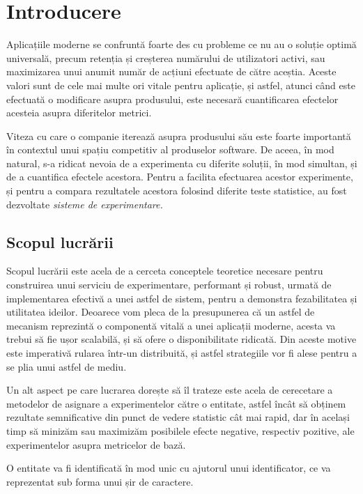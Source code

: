 \chapter{Introducere}

Aplicațiile moderne se confruntă foarte des cu probleme ce nu au o soluție optimă universală, precum retenția și creșterea numărului de utilizatori activi, sau maximizarea unui anumit număr de acțiuni efectuate de către aceștia. Aceste valori sunt de cele mai multe ori vitale pentru aplicație, și astfel, atunci când este efectuată o modificare asupra produsului, este necesară cuantificarea efectelor acesteia asupra diferitelor metrici. 

Viteza cu care o companie iterează asupra produsului său este foarte importantă în contextul unui spațiu competitiv al produselor software. De aceea, în mod natural, s-a ridicat nevoia de a experimenta cu diferite soluții, în mod simultan, și de a cuantifica efectele acestora. Pentru a facilita efectuarea acestor experimente, și pentru a compara rezultatele acestora folosind diferite teste statistice, au fost dezvoltate \textit{sisteme de experimentare. }

\section{Scopul lucrării}

Scopul lucrării este acela de a cerceta conceptele teoretice necesare pentru construirea unui serviciu de experimentare, performant și robust, urmată de implementarea efectivă a unei astfel de sistem, pentru a demonstra fezabilitatea și utilitatea ideilor. Deoarece vom pleca de la presupunerea că un astfel de mecanism reprezintă o componentă vitală a unei aplicații moderne, acesta va trebui să fie ușor scalabilă, și să ofere o disponibilitate ridicată. Din aceste motive este imperativă rularea într-un distribuită, și astfel strategiile vor fi alese pentru a se plia unui astfel de mediu.

Un alt aspect pe care lucrarea dorește să îl trateze este acela de cerecetare a metodelor de asignare a experimentelor către o entitate, astfel încât să obținem rezultate semnificative din punct de vedere statistic cât mai rapid, dar în același timp să minizăm sau maximizăm posibilele efecte negative, respectiv pozitive, ale experimentelor asupra metricelor de bază. 

\begin{remark}
	O entitate va fi identificată în mod unic cu ajutorul unui identificator, ce va reprezentat sub forma unui șir de caractere.
\end{remark}

